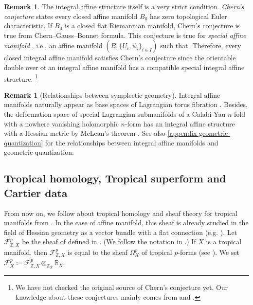 \documentclass[a4paper,dvipdfmx,reqno,12pt]{amsart}
\makeatletter
\newcommand{\ind}[2]{\emph{#1}\index{1{#2}@{#1}}}
\theoremstyle{definition}
\newtheorem{remark}[theorem]{Remark}
\newcommand{\deq}{\coloneqq}
\newcommand{\myfootnote}[1]{\hspace{-5pt}\footnote{#1}}
\numberwithin{equation}{section}
\makeatother
\begin{document}
\begin{remark}
The integral affine structure itself is a very strict condition.
\ind{Chern's conjecture}{Chern's conjecture} states 
every closed affine manifold $B_0$ has zero topological 
Euler characteristic.
If $B_0$ is a closed flat Riemannian manifold, Chern's conjecture is true from Chern--Gauss--Bonnet formula.
This conjecture is true for 
\emph{special affine manifold} \cite{MR3665000},
i.e., an affine manifold $(B, \{U_i,\psi_i\}_{i\in I})$ such that 
$ $
Therefore, every closed integral affine manifold satisfies Chern's conjecture since the orientable double over of an integral affine manifold has a compatible special integral affine structure.
\myfootnote{We have not checked 
the original source of Chern's conjecture yet.
Our knowledge about these conjectures
mainly comes from \cite{goldmanRadianceObstructionParallel1984a}
and \cite{MR3665000}.
}
\end{remark}

\begin{remark}[{Relationships between symplectic geometry}]
Integral affine manifolds naturally appear 
as base spaces of Lagrangian torus fibration 
\cite{duistermaatGlobalActionangleCoordinates1980a}. 
Besides, the deformation space of 
special Lagrangian submanifolds of
a Calabi-Yau $n$-fold with a nowhere vanishing 
holomorphic $n$-form has 
an integral affine structure with 
a Hessian metric by McLean's theorem \cite{MR1664890}.
See also \cref{appendix-geometric-quantization} 
for the relationships between integral affine manifolds 
and geometric quantization. 
\end{remark}







\subsection{Tropical homology, Tropical superform and Cartier data}
From now on, we follow about tropical homology and sheaf 
theory for tropical manifolds
from \cite{mikhalkinTropicalEigenwaveIntermediate2014a,
MR3903579,gross2019sheaftheoretic}.
In the case of affine manifold, this sheaf is already
studied in the field of Hessian geometry as a vector bundle
with a flat connection
(e.g. \cite[Chapter 7]{MR2293045}).
Let $\mathcal{F}^{p}_{\mathbb{Z},X}$ be 
the sheaf of  defined in 
\cite[2.4]{mikhalkinTropicalEigenwaveIntermediate2014a}.
 (We follow the notation in \cite[Definition 2.4]{MR3894860}.)
If $X$ is a tropical manifold, then 
$\mathcal{F}^{p}_{\mathbb{Z},X}$ is equal 
to the sheaf $\Omega_{X}^{p}$ of tropical $p$-forms 
\cite[Definition 2.7]{gross2019sheaftheoretic}
(see \cite[Remark 2.8]{gross2019sheaftheoretic}).
We set $\mathcal{F}^{p}_{X}\deq 
\mathcal{F}^{p}_{\mathbb{Z}, X}
\otimes_{\mathbb{Z}_X}\mathbb{R}_X$.
\end{document}
